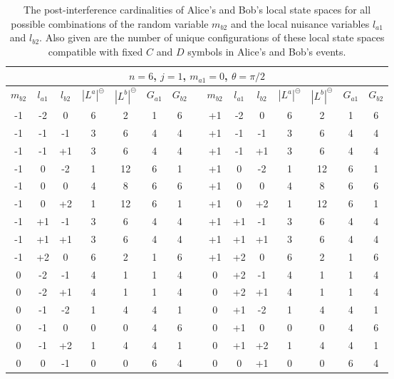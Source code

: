 \documentclass{article}
\begin{document}
\begin{table}[h]
\begin{centering}
\begin{tabular}{|c|c|c|c|c|c|c|c|c|c|c|c|c|c|c|}
\hline 
\multicolumn{15}{|c|}{$n=6$, $j=1$, $m_{a1}=0$, $\theta=\pi/2$}\tabularnewline
\hline 
$m_{b2}$ & $l_{a1}$ & $l_{b2}$ & $|L^{a}|^\circleddash$ & $|L^{b}|^\circleddash$ & $G_{a1}$ & $G_{b2}$ &  & $m_{b2}$ & $l_{a1}$ & $l_{b2}$ & $|L^{a}|^\circleddash$ & $|L^{b}|^\circleddash$ & $G_{a1}$ & $G_{b2}$\tabularnewline
\cline{1-7} \cline{9-15} 
-1 & -2 & 0 & 6 & 2 & 1 & 6 &  & +1 & -2 & 0 & 6 & 2 & 1 & 6\tabularnewline
-1 & -1 & -1 & 3 & 6 & 4 & 4 &  & +1 & -1 & -1 & 3 & 6 & 4 & 4\tabularnewline
-1 & -1 & +1 & 3 & 6 & 4 & 4 &  & +1 & -1 & +1 & 3 & 6 & 4 & 4\tabularnewline
-1 & 0 & -2 & 1 & 12 & 6 & 1 &  & +1 & 0 & -2 & 1 & 12 & 6 & 1\tabularnewline
-1 & 0 & 0 & 4 & 8 & 6 & 6 &  & +1 & 0 & 0 & 4 & 8 & 6 & 6\tabularnewline
-1 & 0 & +2 & 1 & 12 & 6 & 1 &  & +1 & 0 & +2 & 1 & 12 & 6 & 1\tabularnewline
-1 & +1 & -1 & 3 & 6 & 4 & 4 &  & +1 & +1 & -1 & 3 & 6 & 4 & 4\tabularnewline
-1 & +1 & +1 & 3 & 6 & 4 & 4 &  & +1 & +1 & +1 & 3 & 6 & 4 & 4\tabularnewline
-1 & +2 & 0 & 6 & 2 & 1 & 6 &  & +1 & +2 & 0 & 6 & 2 & 1 & 6\tabularnewline
0 & -2 & -1 & 4 & 1 & 1 & 4 &  & 0 & +2 & -1 & 4 & 1 & 1 & 4\tabularnewline
0 & -2 & +1 & 4 & 1 & 1 & 4 &  & 0 & +2 & +1 & 4 & 1 & 1 & 4\tabularnewline
0 & -1 & -2 & 1 & 4 & 4 & 1 &  & 0 & +1 & -2 & 1 & 4 & 4 & 1\tabularnewline
0 & -1 & 0 & 0 & 0 & 4 & 6 &  & 0 & +1 & 0 & 0 & 0 & 4 & 6\tabularnewline
0 & -1 & +2 & 1 & 4 & 4 & 1 &  & 0 & +1 & +2 & 1 & 4 & 4 & 1\tabularnewline
0 & 0 & -1 & 0 & 0 & 6 & 4 &  & 0 & 0 & +1 & 0 & 0 & 6 & 4\tabularnewline
\hline 
\end{tabular}
\par\end{centering}
\caption{The post-interference cardinalities of Alice's and Bob's local state spaces for all possible combinations of the random variable $m_{b2}$ and the local nuisance variables $l_{a1}$ and $l_{b2}$. Also given are the number of unique configurations of these local state spaces compatible with fixed $C$ and $D$ symbols in Alice's and Bob's events.}
\label{tab: sample local 1}
\end{table}
\end{document}
